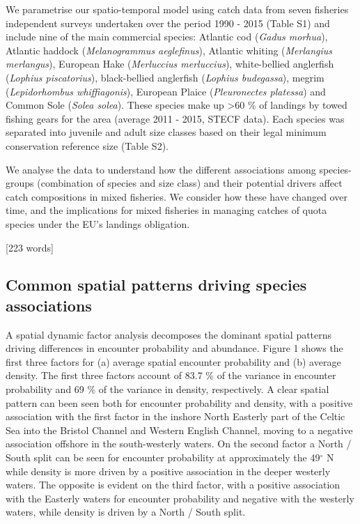 \documentclass{nature}
\begin{document}
\begin{linenumbers}
We parametrise our spatio-temporal model using catch data from seven fisheries
independent surveys undertaken over the period 1990 - 2015 (Table S1) and
include nine of the main commercial species: Atlantic cod (\textit{Gadus
	morhua}), Atlantic haddock (\textit{Melanogrammus aeglefinus}),
Atlantic whiting (\textit{Merlangius merlangus}), European Hake
(\textit{Merluccius merluccius}), white-bellied anglerfish (\textit{Lophius
	piscatorius}), black-bellied anglerfish (\textit{Lophius budegassa}),
megrim (\textit{Lepidorhombus whiffiagonis}), European Plaice
(\textit{Pleuronectes platessa}) and Common Sole (\textit{Solea solea}). These
species make up \textgreater 60 \% of landings by towed fishing gears for the
area (average 2011 - 2015, STECF data). Each species was separated into
juvenile and adult size classes based on their legal minimum conservation
reference size (Table S2).

We analyse the data to understand how the different associations among
species-groups (combination of species and size class) and their potential
drivers affect catch compositions in mixed fisheries. We consider how these
have changed over time, and the implications for mixed fisheries in managing
catches of quota species under the EU's landings obligation.

[223 words]

\subsection{Common spatial patterns driving species associations} A spatial
dynamic factor analysis decomposes the dominant spatial patterns driving
differences in encounter probability and abundance. Figure 1 shows the first
three factors for (a) average spatial encounter probability and (b) average
density. The first three factors account of 83.7 \% of the variance in
encounter probability and 69 \% of the variance in density, respectively. A
clear spatial pattern can been seen both for encounter probability and density,
with a positive association with the first factor in the inshore North Easterly
part of the Celtic Sea into the Bristol Channel and Western English Channel,
moving to a negative association offshore in the south-westerly waters. On the
second factor a North / South split can be seen for encounter probability at
approximately the 49$^{\circ}$ N while density is more driven by a positive
association in the deeper westerly waters.  The opposite is evident on the
third factor, with a positive association with the Easterly waters for
encounter probability and negative with the westerly waters, while density is
driven by a North / South split.


\end{linenumbers}
\end{document}
